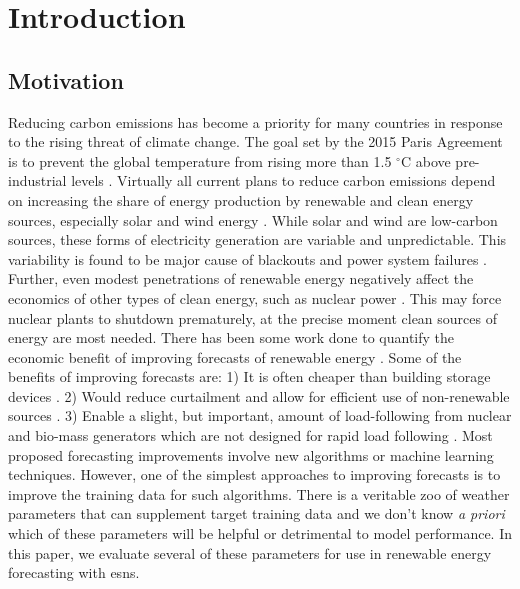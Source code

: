 \section{Introduction}
\subsection{Motivation}
Reducing carbon emissions has become a priority for many countries in response
to the rising threat of climate change. The goal set by the 2015 Paris
Agreement is to prevent the global temperature from rising more than 1.5
$^\circ$C above pre-industrial levels \cite{noauthor_paris_nodate}. Virtually
all current plans to reduce carbon emissions depend on increasing the share of
energy production by renewable and clean energy sources, especially solar and
wind energy \cite{cany_nuclear_2018, chilvers_realising_2017,99th_general_assembly_illinois_2016,isee_illinois_2015}.
 While solar and wind are low-carbon sources, these
forms of electricity generation are variable and unpredictable. This variability
is found to be major cause of blackouts and power system failures
\cite{haes_alhelou_survey_2019}. Further, even modest penetrations of renewable
energy negatively affect the economics of other types of clean energy, such as
nuclear power
\cite{cany_nuclear_2018,keppler_carbon_2011,illinois_commerce_commision_icc_potential_2015}. This may force nuclear plants to shutdown prematurely, at the
precise moment clean sources of energy are most needed. There has been
some work done to quantify the economic benefit of improving forecasts of
renewable energy \cite{wang_quantifying_2016, mc_garrigle_quantifying_2015, brancucci_martinez-anido_value_2016}. Some of the benefits of improving
forecasts are: 1) It is often cheaper than building storage devices
\cite{wang_quantifying_2016}. 2) Would reduce curtailment and allow for
efficient use of non-renewable sources \cite{mc_garrigle_quantifying_2015}.
3) Enable a slight, but important, amount of load-following from nuclear and
bio-mass generators which are not designed for rapid load following
\cite{brancucci_martinez-anido_value_2016}. Most proposed forecasting
improvements involve new algorithms or machine learning techniques. However,
one of the simplest approaches to improving forecasts is to improve the
training data for such algorithms. There is a veritable zoo of weather
parameters that can supplement target training data and we don't know \textit{a
priori} which of these parameters will be helpful or detrimental to model
performance. In this paper, we evaluate several of these parameters for use
in renewable energy forecasting with \glspl{esn}.
